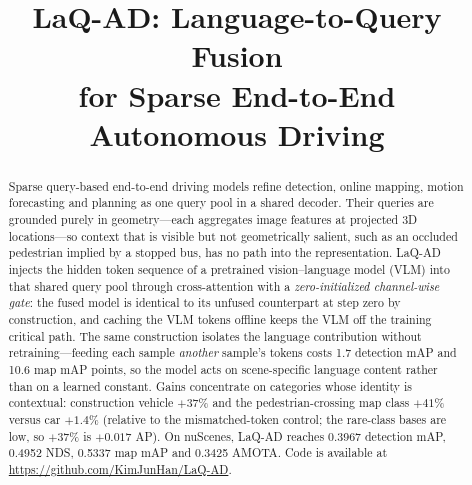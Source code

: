 \documentclass[conference]{IEEEtran}
\newcommand{\measured}[1]{#1}
\begin{document}
\title{LaQ-AD: Language-to-Query Fusion\\
for Sparse End-to-End Autonomous Driving}

\author{
\and
{}
}

\maketitle

\begin{abstract}
Sparse query-based end-to-end driving models refine detection, online mapping,
motion forecasting and planning as one query pool in a shared decoder. Their
queries are grounded purely in geometry---each aggregates image features at
projected 3D locations---so context that is visible but not geometrically
salient, such as an occluded pedestrian implied by a stopped bus, has no path
into the representation. LaQ-AD injects the hidden token sequence of a
pretrained vision--language model (VLM) into that shared query pool through
cross-attention with a \emph{zero-initialized channel-wise gate}: the fused
model is identical to its unfused counterpart at step zero by construction,
and caching the VLM tokens offline keeps the VLM off the training critical
path. The same construction isolates
the language contribution without retraining---feeding each sample
\emph{another} sample's tokens costs \measured{1.7} detection mAP and
\measured{10.6} map mAP points, so the model acts on scene-specific language
content rather than on a learned constant. Gains concentrate on categories
whose identity is contextual: construction vehicle \measured{$+37$}\% and the
pedestrian-crossing map class \measured{$+41$}\% versus car \measured{$+1.4$}\%
(relative to the mismatched-token control; the rare-class bases are low, so
\measured{$+37$}\% is \measured{$+0.017$} AP). On nuScenes,
LaQ-AD reaches \measured{0.3967} detection mAP, \measured{0.4952} NDS,
\measured{0.5337} map mAP and \measured{0.3425} AMOTA. Code is available at
\url{https://github.com/KimJunHan/LaQ-AD}.
\end{abstract}
\end{document}
